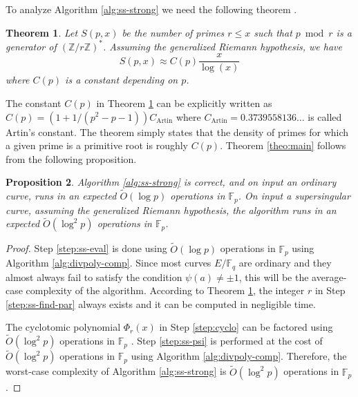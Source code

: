 \documentclass[12pt]{article}
\theoremstyle{plain}
\newtheorem{theorem}{Theorem}
\newtheorem{proposition}[theorem]{Proposition}
\theoremstyle{definition}
\newcommand{\tildO}{\tilde{O}}
\def\Z{\ensuremath{\mathbb{Z}}}
\def\F{\ensuremath{\mathbb{F}}}
\begin{document}
To analyze Algorithm \ref{alg:ss-strong} we need the following theorem \cite{hooley1967artin, 
matthews1976generalisation, finch2003mathematical}.
\begin{theorem}
	\label{theo:Artin}
	Let $S(p, x)$ be the number of primes $r \le x$ such that $p \bmod r$ is a generator of 
	$(\Z/r\Z)^*$. Assuming the generalized Riemann hypothesis, we have 
	\[ S(p, x) \approx C(p)\frac{x}{\log(x)}\]
	where $C(p)$ is a constant depending on $p$.
\end{theorem}
The constant $C(p)$ in Theorem \ref{theo:Artin} can be explicitly written as $C(p) = (1 + 1 / (p^2 
- p - 1))C_{\text{Artin}}$ where $C_{\text{Artin}} = 0.3739558136\dots$ is called Artin's 
constant. The theorem simply states that the density of primes for which a given prime is a 
primitive root is roughly $C(p)$. Theorem \ref{theo:main} follows from the following proposition.
\begin{proposition}
	\label{prop:ss-strong}
	Algorithm \ref{alg:ss-strong} is correct, and on input an ordinary curve, runs in an expected 
	$\tildO(\log p)$ operations in $\F_p$. On input a supersingular curve, assuming the generalized 
	Riemann hypothesis, the algorithm runs in an expected $\tildO(\log^2 p)$ operations in $\F_p$.
\end{proposition}
\begin{proof}
	Step \ref{step:ss-eval} is done using $\tildO(\log p)$ operations in $\F_p$ using Algorithm 
	\ref{alg:divpoly-comp}. Since most curves $E/\F_q$ are ordinary and they almost always fail to 
	satisfy the condition $\psi(a) \ne \pm 1$, this will be the average-case complexity of the 
	algorithm. According to Theorem \ref{theo:Artin}, the integer $r$ in Step  
	\ref{step:ss-find-par} always exists and it can be computed in negligible time. 
	
	The cyclotomic polynomial $\Phi_r(x)$ in Step \ref{step:cyclo} can be factored using 
	$\tildO(\log^2p)$ operations in $\F_p$ \cite{shoup1994}. Step \ref{step:ss-psi} is performed at 
	the cost of $\tildO(\log^2p)$ operations in $\F_p$ using Algorithm \ref{alg:divpoly-comp}. 
	Therefore, the worst-case complexity of Algorithm \ref{alg:ss-strong} is $\tildO(\log^2 p)$ 
	operations in $\F_p$.
\end{proof}
\end{document}

